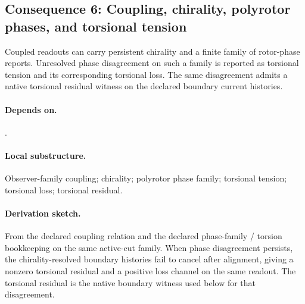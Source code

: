 \subsection{Consequence 6: Coupling, chirality, polyrotor phases, and torsional tension}
\begin{consequence}\label{cons:c6}
Coupled readouts can carry persistent chirality and a finite family of rotor-phase reports. Unresolved phase disagreement on such a family is reported as torsional tension and its corresponding torsional loss. The same disagreement admits a native torsional residual witness on the declared boundary current histories.
\end{consequence}
\paragraph{Depends on.} .
\paragraph{Local substructure.} Observer-family coupling; chirality; polyrotor phase family; torsional tension; torsional loss; torsional residual.
\paragraph{Derivation sketch.} From the declared coupling relation and the declared phase-family / torsion bookkeeping on the same active-cut family. When phase disagreement persists, the chirality-resolved boundary histories fail to cancel after alignment, giving a nonzero torsional residual and a positive loss channel on the same readout. The torsional residual is the native boundary witness used below for that disagreement.
